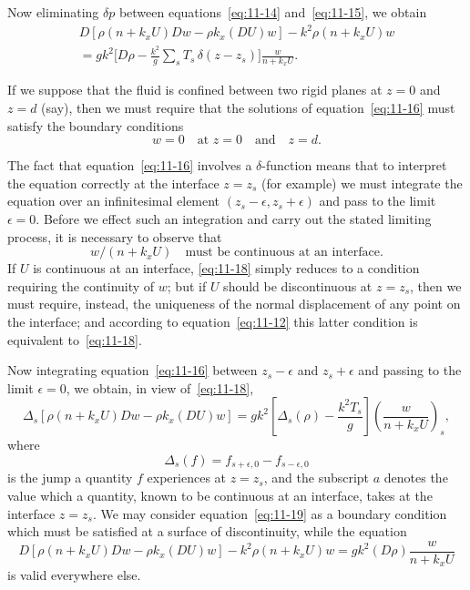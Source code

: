 Now eliminating $\delta p$ between equations~\eqref{eq:11-14} and~\eqref{eq:11-15}, we obtain
\begin{multline}
\label{eq:11-16}
D\!\left[\rho(n+k_x U)Dw - \rho k_x(DU)w\right] - k^2\rho(n+k_x U)w \\
= gk^2\bigg[D\rho - \frac{k^2}{g}\sum_s T_s\,\delta(z-z_s)\bigg]\frac{w}{n+k_x U}.
\end{multline}

If we suppose that the fluid is confined between two rigid planes at $z=0$ and $z=d$ (say), then we must require that the solutions of equation~\eqref{eq:11-16} must satisfy the boundary conditions
\begin{equation}
\label{eq:11-17}
w = 0 \quad\text{at } z = 0 \quad\text{and}\quad z = d.
\end{equation}

The fact that equation~\eqref{eq:11-16} involves a $\delta$-function means that to interpret the equation correctly at the interface $z = z_s$ (for example) we must integrate the equation over an infinitesimal element $(z_s-\epsilon, z_s+\epsilon)$ and pass to the limit $\epsilon = 0$. Before we effect such an integration and carry out the stated limiting process, it is necessary to observe that
\begin{equation}
\label{eq:11-18}
w/(n+k_x U) \quad\text{must be continuous at an interface.}
\end{equation}
If $U$ is continuous at an interface, \eqref{eq:11-18} simply reduces to a condition requiring the continuity of $w$; but if $U$ should be discontinuous at $z = z_s$, then we must require, instead, the uniqueness of the normal displacement of any point on the interface; and according to equation~\eqref{eq:11-12} this latter condition is equivalent to~\eqref{eq:11-18}.

Now integrating equation~\eqref{eq:11-16} between $z_s-\epsilon$ and $z_s+\epsilon$ and passing to the limit $\epsilon = 0$, we obtain, in view of~\eqref{eq:11-18},
\begin{equation}
\label{eq:11-19}
\Delta_s\!\left[\rho(n+k_x U)Dw - \rho k_x(DU)w\right] = gk^2\!\left[\Delta_s(\rho)-\frac{k^2T_s}{g}\right]\!\left(\frac{w}{n+k_x U}\right)_{\!s}\!,
\end{equation}
where
\begin{equation}
\label{eq:11-20}
\Delta_s(f) = f_{s+\epsilon,0} - f_{s-\epsilon,0}
\end{equation}
is the jump a quantity $f$ experiences at $z = z_s$, and the subscript $a$ denotes the value which a quantity, known to be continuous at an interface, takes at the interface $z = z_s$. We may consider equation~\eqref{eq:11-19} as a boundary condition which must be satisfied at a surface of discontinuity, while the equation
\begin{equation}
\label{eq:11-21}
D\!\left[\rho(n+k_x U)Dw - \rho k_x(DU)w\right] - k^2\rho(n+k_x U)w = gk^2(D\rho)\frac{w}{n+k_x U}
\end{equation}
is valid everywhere else.

